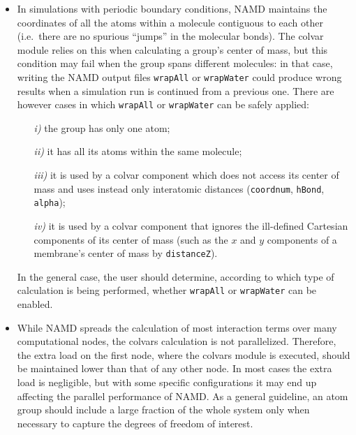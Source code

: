\begin{itemize}

\item In simulations with periodic boundary conditions, NAMD maintains
  the coordinates of all the atoms within a molecule contiguous to
  each other (i.e.~there are no spurious ``jumps'' in the molecular
  bonds).  The colvar module relies on this when calculating a group's
  center of mass, but this condition may fail when the group spans
  different molecules: in that case, writing the NAMD output files
  \texttt{wrapAll} or \texttt{wrapWater} could produce wrong results
  when a simulation run is continued from a previous one.  There are
  however cases in which \texttt{wrapAll} or \texttt{wrapWater} can be
  safely applied:
  \begin{enumerate}
  \item[\emph{i)}] the group has only one atom;
  \item[\emph{ii)}] it has all its atoms within the same molecule;
  \item[\emph{iii)}] it is used by a colvar component which does not
    access its center of mass and uses instead only interatomic
    distances (\texttt{coordnum}, \texttt{hBond}, \texttt{alpha});
  \item[\emph{iv)}] it is used by a colvar component that ignores the
    ill-defined Cartesian components of its center of mass (such as
    the $x$ and $y$ components of a membrane's center of mass by
    \texttt{distanceZ}).
  \end{enumerate}    
  In the general case, the user should determine, according to which
  type of calculation is being performed, whether \texttt{wrapAll} or
  \texttt{wrapWater} can be enabled.

\item While NAMD spreads the calculation of most interaction terms
  over many computational nodes, the colvars calculation is not
  parallelized.  Therefore, the extra load on the first node, where
  the colvars module is executed, should be maintained lower than that
  of any other node.  In most cases the extra load is negligible, but
  with some specific configurations it may end up affecting the
  parallel performance of NAMD.  As a general guideline, an atom group
  should include a large fraction of the whole system only when
  necessary to capture the degrees of freedom of interest.

\end{itemize}



